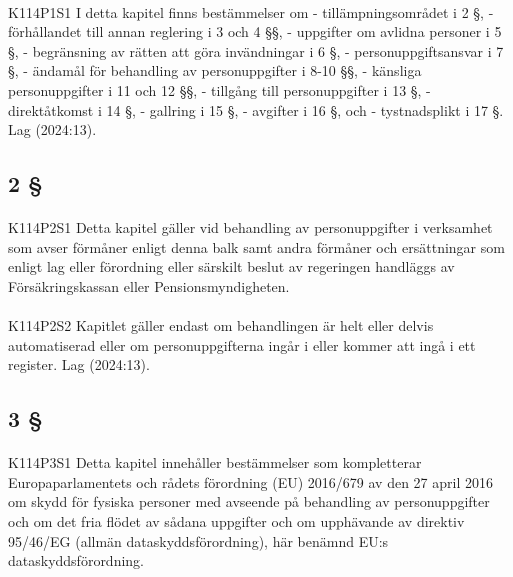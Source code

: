 \documentclass[a4paper,notitlepage,openany,10pt]{book}
\begin{document}
\paragraph*{}
{\tiny K114P1S1}
I detta kapitel finns bestämmelser om
\newline - tillämpningsområdet i 2 §,
\newline - förhållandet till annan reglering i 3 och 4 §§,
\newline - uppgifter om avlidna personer i 5 §,
\newline - begränsning av rätten att göra invändningar i 6 §,
\newline - personuppgiftsansvar i 7 §,
\newline - ändamål för behandling av personuppgifter i 8-10 §§,
\newline - känsliga personuppgifter i 11 och 12 §§,
\newline - tillgång till personuppgifter i 13 §,
\newline - direktåtkomst i 14 §,
\newline - gallring i 15 §,
\newline - avgifter i 16 §, och
\newline - tystnadsplikt i 17 §.
Lag (2024:13).
\subsection*{2 §}
\paragraph*{}
{\tiny K114P2S1}
Detta kapitel gäller vid behandling av personuppgifter i verksamhet som avser förmåner enligt denna balk samt andra förmåner och ersättningar som enligt lag eller förordning eller särskilt beslut av regeringen handläggs av Försäkringskassan eller Pensionsmyndigheten.
\paragraph*{}
{\tiny K114P2S2}
Kapitlet gäller endast om behandlingen är helt eller delvis automatiserad eller om personuppgifterna ingår i eller kommer att ingå i ett register.
Lag (2024:13).
\subsection*{3 §}
\paragraph*{}
{\tiny K114P3S1}
Detta kapitel innehåller bestämmelser som kompletterar Europaparlamentets och rådets förordning (EU) 2016/679 av den 27 april 2016 om skydd för fysiska personer med avseende på behandling av personuppgifter och om det fria flödet av sådana uppgifter och om upphävande av direktiv 95/46/EG (allmän dataskyddsförordning), här benämnd EU:s dataskyddsförordning.
\end{document}
